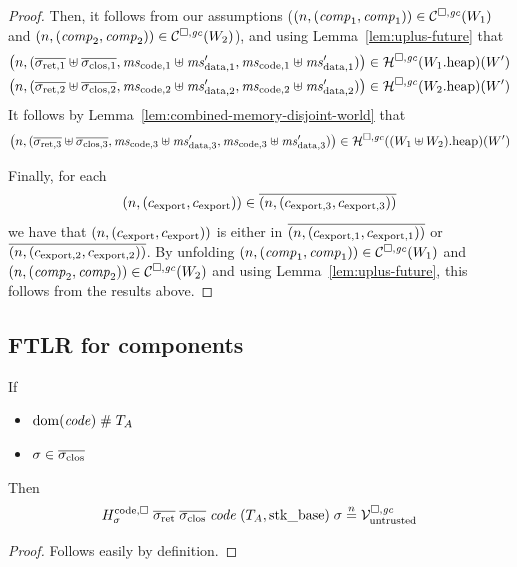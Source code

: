 \documentclass[a4paper]{article}
\begin{document}
\begin{proof}
  Then, it follows from our assumptions ($\left(n,(\mathit{comp}_1,\mathit{comp}_1)\right) \in \mathcal{C}^{\square,\mathit{gc}}(W_1)$ and $\left(n,(\mathit{comp}_2,\mathit{comp}_2)\right) \in \mathcal{C}^{\square,\mathit{gc}}(W_2)$), and using Lemma~\ref{lem:uplus-future} that
  \begin{align*}
    \npair{(\sigrets[1]\uplus\sigcloss[1],\mscode[1]\uplus \msdata[1]', \mscode[1]\uplus\msdata[1]')} &\in \lrheap(\pwheap[W_1])(W')\\
    \npair{(\sigrets[2]\uplus\sigcloss[2],\mscode[2]\uplus \msdata[2]', \mscode[2]\uplus\msdata[2]')} &\in \lrheap(\pwheap[W_2])(W')
  \end{align*}
  It follows by Lemma~\ref{lem:combined-memory-disjoint-world} that 
  \begin{equation*}
    \npair{(\sigrets[3]\uplus\sigcloss[3],\mscode[3]\uplus \msdata[3]', \mscode[3]\uplus\msdata[3]')} \in \lrheap(\pwheap[(W_1\uplus W_2)])(W')
  \end{equation*}
  
  Finally, for each
  \begin{equation*}
    \left(n,(c_{\mathrm{export}},c_{\mathrm{export}})\right) \in \overline{\left(n,(c_{\mathrm{export},3},c_{\mathrm{export},3})\right)}
  \end{equation*}
  we have that $\left(n,(c_{\mathrm{export}},c_{\mathrm{export}})\right)$ is either in $\overline{\left(n,(c_{\mathrm{export},1},c_{\mathrm{export},1})\right)}$ or $\overline{\left(n,(c_{\mathrm{export},2},c_{\mathrm{export},2})\right)}$.
  By unfolding $\left(n,(\mathit{comp}_1,\mathit{comp}_1)\right) \in \mathcal{C}^{\square,\mathit{gc}}(W_1)$ and $\left(n,(\mathit{comp}_2,\mathit{comp}_2)\right) \in \mathcal{C}^{\square,\mathit{gc}}(W_2)$ and using Lemma~\ref{lem:uplus-future}, this follows from the results above.
\end{proof}

\subsection{FTLR for components}
\label{sec:ftlr-for-comps}

\begin{lemma}
  \label{lem:untrusted-codereg-sealed-vals-safe}
  If
  \begin{itemize}
  \item $\mathrm{dom}(\mathit{code}) \mathrel{\#} T_{A}$
  \item $\sigma \in \sigcloss$
  \end{itemize}
  Then
  \begin{equation*}
    H^\mathrm{code,\square}_\sigma \; \sigrets \; \sigcloss \; \code \; (\ta,\stkb) \; \sigma \nequal \lrv
  \end{equation*}
\end{lemma}
\begin{proof}
  Follows easily by definition.
\end{proof}
\end{document}
